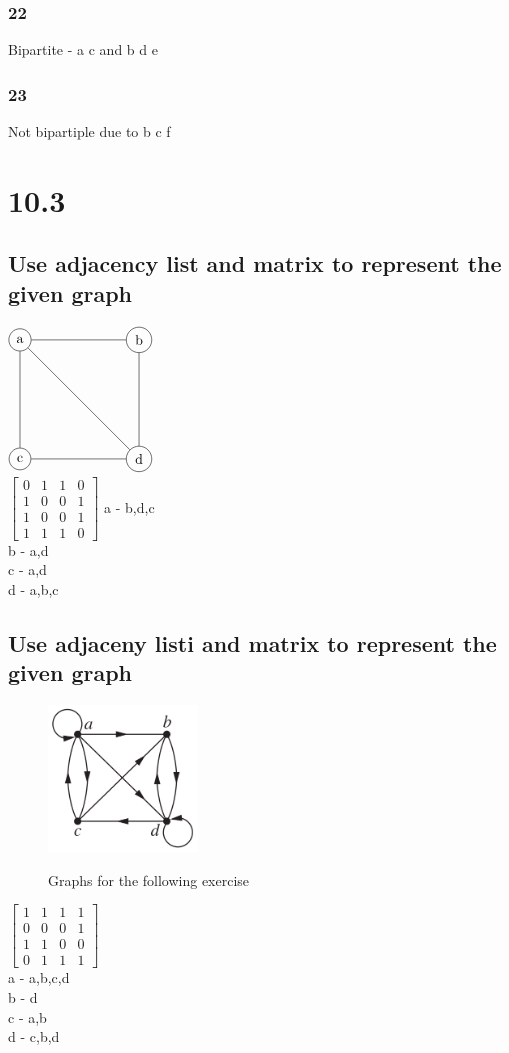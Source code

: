\documentclass[12pt, a4paper]{report}
\begin{document}
			\subsubsection{22}
				Bipartite - a c and b d e
			\subsubsection{23}
				Not bipartiple due to b c f
	\section{10.3}
		\subsection{Use adjacency list and matrix to represent the given graph}
			$\begin{tikzpicture}[scale=3]
						\tikzstyle{vertex}=[circle,draw=black]
						\node[vertex](v1) at (0,0){c};
						\node[vertex](v2) at (1,0){d};
						\node[vertex](v4) at (0,1) {a};
						\node[vertex](v3) at (1,1) {b};
						\path[-]
							(v2) edge node {}(v3)
							(v4) edge node {}(v1)
							(v3) edge node {}(v4)
							(v4) edge node {}(v2)
							(v1) edge node {} (v2);
					\end{tikzpicture}$\\
			$\begin{bmatrix}
				0&1&1&0\\
				1&0&0&1\\
				1&0&0&1\\
				1&1&1&0
			\end{bmatrix}$
			a - b,d,c\\
			b - a,d\\
			c - a,d\\
			d - a,b,c
		\clearpage
		\setcounter{subsection}{2}
		\subsection{Use adjaceny listi and matrix to represent the given graph}
			\begin{figure}[h!]
				\centering
				\includegraphics[width=150px]{assets/10,3,3.png}
				\label{10,3,3}
				\caption{Graphs for the following exercise}
			\end{figure}
			$\begin{bmatrix}
				1&1&1&1\\
				0&0&0&1\\
				1&1&0&0\\
				0&1&1&1
			\end{bmatrix}$\\
			a - a,b,c,d\\
			b - d\\
			c - a,b\\
			d - c,b,d
	\setcounter{section}{0}
\end{document}
